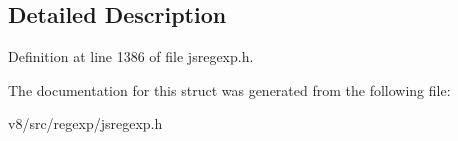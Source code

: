 \subsection{Detailed Description}


Definition at line 1386 of file jsregexp.\+h.



The documentation for this struct was generated from the following file\+:\begin{DoxyCompactItemize}
\item 
v8/src/regexp/jsregexp.\+h\end{DoxyCompactItemize}
